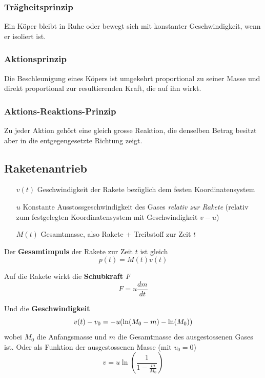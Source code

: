 \documentclass[7pt]{article}
\begin{document}
\begin{multicols*}{3}
\subsubsection{Tr{\"a}gheitsprinzip}

Ein K{\"o}per bleibt in Ruhe oder bewegt sich mit konstanter Geschwindigkeit, wenn er isoliert ist.

\subsubsection{Aktionsprinzip}

Die Beschleunigung eines K{\"o}pers ist umgekehrt proportional zu seiner Masse und direkt proportional zur resultierenden Kraft, die auf ihn wirkt. 

\subsubsection{Aktions-Reaktions-Prinzip}

Zu jeder Aktion geh{\"o}rt eine gleich grosse Reaktion, die denselben Betrag besitzt aber in die entgegengesetzte Richtung zeigt.

\subsection{Raketenantrieb}

\begin{enumerate}
	\item [$v(t)$] Geschwindigkeit der Rakete bez{\"u}glich dem festen Koordinatensystem
	\item [$u$] Konstante Ausstossgeschwindigkeit des Gases \emph{relativ zur Rakete} (relativ zum festgelegten Koordinatensystem mit Geschwindigkeit $v-u$)
	\item [$M(t)$] Gesamtmasse, also Rakete + Treibstoff zur Zeit $t$
\end{enumerate}

Der \textbf{Gesamtimpuls} der Rakete zur Zeit $t$ ist gleich
\begin{equation*}
	p(t) = M(t)v(t)
\end{equation*}

Auf die Rakete wirkt die \textbf{Schubkraft $F$}
\begin{equation*}
	F = u\frac{dm}{dt}
\end{equation*}

Und die \textbf{Geschwindigkeit}
\begin{equation*}
	v(t) - v_0 = -u(\ln(M_0 - m) - \ln(M_0))\\
\end{equation*}
wobei $M_0$ die Anfangsmasse und $m$ die Gesamtmasse des ausgestossenen Gases ist. \newline
Oder als Funktion der ausgestossenen Masse (mit $v_0 = 0$)
\begin{equation*}
	v = u\ln(\frac{1}{1-\frac{m}{M_0}})
\end{equation*}


\end{multicols*}
\end{document}
